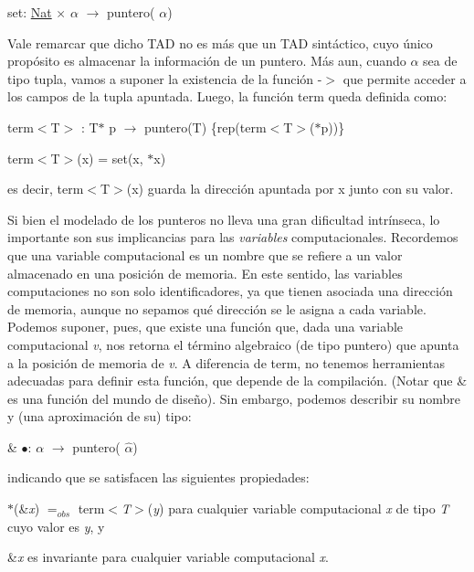 \begin{DoxyItemize}
\item set\-: \hyperlink{classNat}{\-Nat} $\times$ $\alpha$ $\to$ puntero( $\alpha$)
\end{DoxyItemize}

\-Vale remarcar que dicho \-T\-A\-D no es más que un \-T\-A\-D sintáctico, cuyo único propósito es almacenar la información de un puntero. \-Más aun, cuando $\alpha$ sea de tipo tupla, vamos a suponer la existencia de la función -\/$>$ que permite acceder a los campos de la tupla apuntada. \-Luego, la función term queda definida como\-:
\begin{DoxyItemize}
\item term$<$\-T$>$ \-: \-T$\ast$ p $\to$ puntero(\-T) \{rep(term$<$\-T$>$($\ast$p))\}
\item term$<$\-T$>$(x) = set(x, $\ast$x)
\end{DoxyItemize}

es decir, term$<$\-T$>$(x) guarda la dirección apuntada por x junto con su valor.

\-Si bien el modelado de los punteros no lleva una gran dificultad intrínseca, lo importante son sus implicancias para las {\itshape variables\/} computacionales. \-Recordemos que una variable computacional es un nombre que se refiere a un valor almacenado en una posición de memoria. \-En este sentido, las variables computaciones no son solo identificadores, ya que tienen asociada una dirección de memoria, aunque no sepamos qué dirección se le asigna a cada variable. \-Podemos suponer, pues, que existe una función que, dada una variable computacional {\itshape v\/}, nos retorna el término algebraico (de tipo puntero) que apunta a la posición de memoria de {\itshape v\/}. \-A diferencia de term, no tenemos herramientas adecuadas para definir esta función, que depende de la compilación. (\-Notar que \& es una función del mundo de diseño). \-Sin embargo, podemos describir su nombre y (una aproximación de su) tipo\-:
\begin{DoxyItemize}
\item \& $\bullet$\-: $\alpha$ $\to$ puntero( $\widehat{\alpha}$)
\end{DoxyItemize}

indicando que se satisfacen las siguientes propiedades\-:
\begin{DoxyEnumerate}
\item $\ast$(\&{\itshape x\/}) $=_{obs}$ term$<${\itshape \-T$>$\/}({\itshape y\/}) para cualquier variable computacional {\itshape x\/} de tipo {\itshape \-T\/} cuyo valor es {\itshape y\/}, y
\item \&{\itshape x\/} es invariante para cualquier variable computacional {\itshape x\/}.
\end{DoxyEnumerate}

